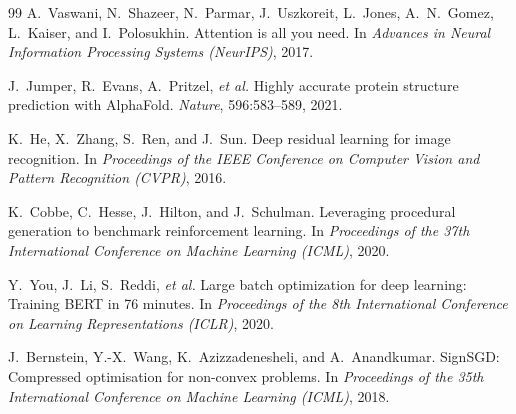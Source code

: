 \documentclass[11pt,twoside,openright]{book}
\begin{document}
\begin{thebibliography}{99}
A.~Vaswani, N.~Shazeer, N.~Parmar, J.~Uszkoreit, L.~Jones, A.~N.~Gomez,
  L.~Kaiser, and I.~Polosukhin.
\newblock Attention is all you need.
\newblock In \emph{Advances in Neural Information Processing Systems (NeurIPS)},
  2017.

J.~Jumper, R.~Evans, A.~Pritzel, \emph{et al.}
\newblock Highly accurate protein structure prediction with AlphaFold.
\newblock \emph{Nature}, 596:583--589, 2021.

K.~He, X.~Zhang, S.~Ren, and J.~Sun.
\newblock Deep residual learning for image recognition.
\newblock In \emph{Proceedings of the IEEE Conference on Computer Vision and
  Pattern Recognition (CVPR)}, 2016.

K.~Cobbe, C.~Hesse, J.~Hilton, and J.~Schulman.
\newblock Leveraging procedural generation to benchmark reinforcement learning.
\newblock In \emph{Proceedings of the 37th International Conference on Machine
  Learning (ICML)}, 2020.

Y.~You, J.~Li, S.~Reddi, \emph{et al.}
\newblock Large batch optimization for deep learning: Training BERT in 76
  minutes.
\newblock In \emph{Proceedings of the 8th International Conference on Learning
  Representations (ICLR)}, 2020.

J.~Bernstein, Y.-X.~Wang, K.~Azizzadenesheli, and A.~Anandkumar.
\newblock SignSGD: Compressed optimisation for non-convex problems.
\newblock In \emph{Proceedings of the 35th International Conference on Machine
  Learning (ICML)}, 2018.

\end{thebibliography}
\end{document}
